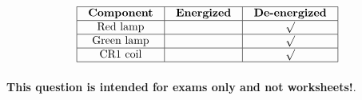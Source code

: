 $$\vbox{\offinterlineskip
\halign{\strut
\vrule \quad\hfil # \ \hfil & 
\vrule \quad\hfil # \ \hfil & 
\vrule \quad\hfil # \ \hfil \vrule \cr
\noalign{\hrule}
%
{\bf Component} & {\bf Energized} & {\bf De-energized} \cr
%
\noalign{\hrule}
%
Red lamp &  & $\surd$ \cr
%
\noalign{\hrule}
%
Green lamp &  & $\surd$ \cr
%
\noalign{\hrule}
%
CR1 coil &  & $\surd$ \cr
%
\noalign{\hrule}
} %
}$$ %








{\bf This question is intended for exams only and not worksheets!}.


